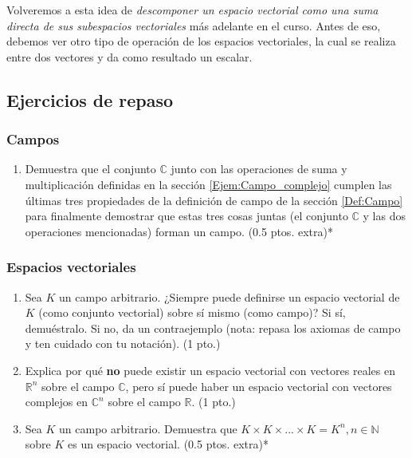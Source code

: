 \documentclass[12pt]{article}
\begin{document}
Volveremos a esta idea de \emph{descomponer un espacio vectorial como una suma directa de sus subespacios vectoriales} más adelante en el curso. Antes de eso, debemos ver otro tipo de operación de los espacios vectoriales, la cual se realiza entre dos vectores y da como resultado un escalar.

\subsection{Ejercicios de repaso}

\subsubsection{Campos}

\begin{enumerate}
    \item Demuestra que el conjunto $\mathbb{C}$ junto con las operaciones de suma y multiplicación definidas en la sección \ref{Ejem:Campo_complejo} cumplen las últimas tres propiedades de la definición de campo de la sección \ref{Def:Campo} para finalmente demostrar que estas tres cosas juntas (el conjunto $\mathbb{C}$ y las dos operaciones mencionadas) forman un campo. (0.5 ptos. extra)*
\end{enumerate}

\subsubsection{Espacios vectoriales} \label{Ejer:Espacios_vectoriales}

\begin{enumerate}
    \item Sea $K$ un campo arbitrario. ¿Siempre puede definirse un espacio vectorial de $K$ (como conjunto vectorial) sobre sí mismo (como campo)? Si sí, demuéstralo. Si no, da un contraejemplo (nota: repasa los axiomas de campo y ten cuidado con tu notación). (1 pto.)
    \item Explica por qué \textbf{no} puede existir un espacio vectorial con vectores reales en $\mathbb{R}^n$ sobre el campo $\mathbb{C}$, pero sí puede haber un espacio vectorial con vectores complejos en $\mathbb{C}^n$ sobre el campo $\mathbb{R}$. (1 pto.)
    \item Sea $K$ un campo arbitrario. Demuestra que $K\times K\times ...\times K=K^n, n\in\mathbb{N}$ sobre $K$ es un espacio vectorial. (0.5 ptos. extra)*
\end{enumerate}
\end{document}
